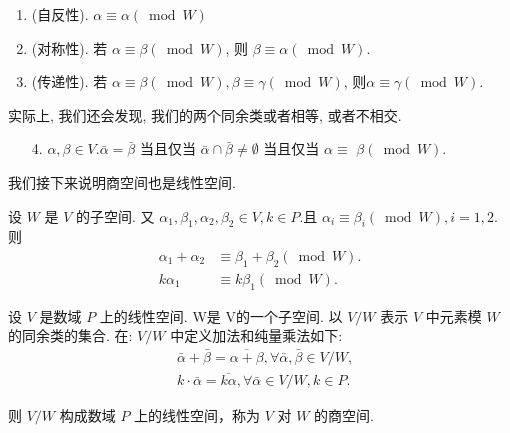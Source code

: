 \documentclass{ctexart}
\begin{document}
\begin{enumerate}

    \item (自反性). $\alpha \equiv \alpha(\bmod W)$
    \item (对称性). 若 $\alpha \equiv \beta(\bmod W)$, 则 $\beta \equiv \alpha(\bmod W)$.
    \item (传递性). 若 $\alpha \equiv \beta(\bmod W), \beta \equiv \gamma(\bmod W)$, 则$\alpha \equiv \gamma(\bmod W)$.
\end{enumerate}

实际上, 我们还会发现, 我们的两个同余类或者相等, 或者不相交.

\begin{itemize}
    \item [4.] $\alpha, \beta \in V . \bar{\alpha}=\bar{\beta}$ 当且仅当 $\bar{\alpha} \cap \bar{\beta} \neq \emptyset$ 当且仅当 $\alpha \equiv$ $\beta(\bmod W)$.
\end{itemize}

我们接下来说明商空间也是线性空间. 

\begin{theorem}
设 $W$ 是 $V$ 的子空间. 又 $\alpha_1, \beta_1, \alpha_2, \beta_2 \in V, k \in P$.且 $\alpha_i \equiv \beta_i(\bmod W), i=1,2$. 则
$$
\begin{aligned}
\alpha_1+\alpha_2 & \equiv \beta_1+\beta_2(\bmod W) . \\
k \alpha_1 & \equiv k \beta_1(\bmod W) .
\end{aligned}
$$
    
\end{theorem}

\begin{theorem}
 设 $V$ 是数域 $P$ 上的线性空间. W是 V的一个子空间. 以 $V / W$ 表示 $V$ 中元素模 $W$ 的同余类的集合. 在: $V / W$ 中定义加法和纯量乘法如下:
$$
\begin{aligned}
& \bar{\alpha}+\bar{\beta}=\overline{\alpha+\beta}, \forall \bar{\alpha}, \bar{\beta} \in V / W, \\
& k \cdot \bar{\alpha}=\overline{k \alpha}, \forall \bar{\alpha} \in V / W, k \in P .
\end{aligned}
$$

则 $V / W$ 构成数域 $P$ 上的线性空间，称为 $V$ 对 $W$ 的商空间.
\end{theorem}
\end{document}
